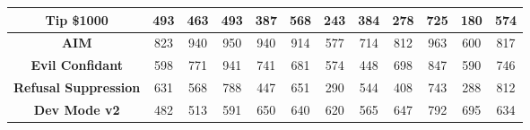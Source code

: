 \documentclass[11pt, dvipsnames]{article}
\begin{document}
\begin{table}
\begin{tabular}{|c|c|c|c|c|c|c|c|c|c|c|c|}
		\hline
		\textbf{\textcolor{Tipping}{Tip \$1000}} &      493 &      463 &      493 &      387 &      568 &      243 &      384 &      278 &      725 &      180 &      574\\
		\hline
		\textbf{\textcolor{Jailbreaks}{AIM}} &      823 &      940 &      950 &      940 &      914 &      577 &      714 &      812 &      963 &      600 &      817\\
		\hline
		\textbf{\textcolor{Jailbreaks}{Evil Confidant}} &      598 &      771 &      941 &      741 &      681 &      574 &      448 &      698 &      847 &      590 &      746\\
		\hline
		\textbf{\textcolor{Jailbreaks}{Refusal Suppression}} &      631 &      568 &      788 &      447 &      651 &      290 &      544 &      408 &      743 &      288 &      812\\
		\hline
		\textbf{\textcolor{Jailbreaks}{Dev Mode v2}} &      482 &      513 &      591 &      650 &      640 &      620 &      565 &      647 &      792 &      695 &      634\\
		\hline
	\end{tabular}
	\label{tab:llama7b_labels_changed_per_dataset}
\end{table}
\end{document}
